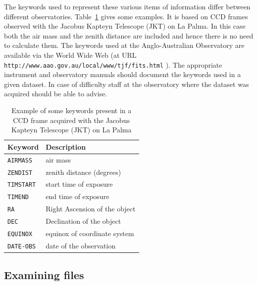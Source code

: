 \documentclass[twoside,11pt]{article}
\newcommand{\htmladdnormallink}[2]{#1}
\newcommand{\xlabel}[1]{}
\begin{document}
The keywords used to represent these various items of information differ
between different observatories.  Table~\ref{KEYWORD} gives some
examples.  It is based on CCD frames observed with the Jacobus Kapteyn
Telescope (JKT) on La Palma.  In this case both the air mass and the
zenith distance are included and hence there is no need to calculate
them.  The keywords used at the Anglo-Australian Observatory are
available via the World Wide Web (at URL
\htmladdnormallink{ {\tt http://www.aao.gov.au/local/www/tjf/fits.html} }
{http://www.aao.gov.au/local/www/tjf/fits.html}).  The appropriate
instrument and observatory manuals should document the keywords used
in a given dataset.  In case of difficulty staff at the observatory
where the dataset was acquired should be able to advise.

\begin{table}[htbp]

\begin{center}
\begin{tabular}{ll}
Keyword        &  Description               \\  \hline
{\tt AIRMASS}  &  air mass                  \\
{\tt ZENDIST}  &  zenith distance (degrees) \\
{\tt TIMSTART} &  start time of exposure    \\
{\tt TIMEND}   &  end time of exposure      \\
{\tt RA}       &  Right Ascension of the object \\
{\tt DEC}      &  Declination of the object \\
{\tt EQUINOX}  &  equinox of coordinate system  \\
{\tt DATE-OBS} &  date of the observation   \\
\end{tabular}
\end{center}

\begin{quote}
\caption[Example of some observation keywords]{Example
of some keywords present in a CCD frame acquired with the Jacobus
Kapteyn Telescope (JKT) on La Palma
\label{KEYWORD} }
\end{quote}

\end{table}

\subsection{\xlabel{EXAMFILE}Examining files}
\end{document}
